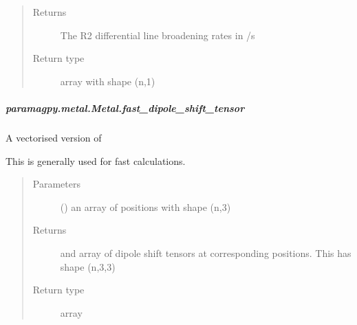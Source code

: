 \documentclass[a4paper,10pt,english]{sphinxmanual}
\begin{document}
\begin{fulllineitems}
\begin{fulllineitems}
\begin{fulllineitems}
\begin{quote}
\begin{description}
\item[{Returns}] \leavevmode
{} \textendash{} The R2 differential line broadening rates in /s

\item[{Return type}] \leavevmode
array with shape (n,1)

\end{description}\end{quote}

\end{fulllineitems}



\subparagraph{paramagpy.metal.Metal.fast\_dipole\_shift\_tensor}
\label{\detokenize{reference/generated/paramagpy.metal.Metal.fast_dipole_shift_tensor:paramagpy-metal-metal-fast-dipole-shift-tensor}}\label{\detokenize{reference/generated/paramagpy.metal.Metal.fast_dipole_shift_tensor::doc}}

\begin{fulllineitems}
\label{\detokenize{reference/generated/paramagpy.metal.Metal.fast_dipole_shift_tensor:paramagpy.metal.Metal.fast_dipole_shift_tensor}}
A vectorised version of
{\hyperref[\detokenize{reference/generated/paramagpy.metal.Metal.dipole_shift_tensor:paramagpy.metal.Metal.dipole_shift_tensor}]{}}

This is generally used for fast calculations.
\begin{quote}\begin{description}
\item[{Parameters}] \leavevmode
{} () \textendash{} an array of positions with shape (n,3)

\item[{Returns}] \leavevmode
{} \textendash{} and array of dipole shift tensors at corresponding positions.
This has shape (n,3,3)

\item[{Return type}] \leavevmode
array

\end{description}\end{quote}


\end{fulllineitems}
\end{fulllineitems}
\end{fulllineitems}
\end{document}
